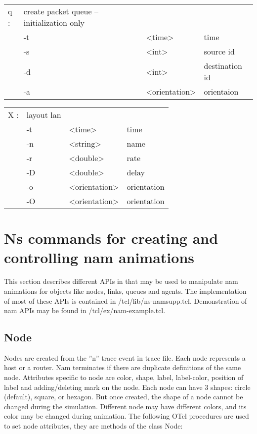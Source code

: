   \begin{tabular}{llll}
  q : & create packet queue -- initialization only & & \\
    &  -t & <time> & time \\
    &  -s & <int> & source id \\
    &  -d & <int> & destination id \\
    &  -a & <orientation> & orientaion \\
  \end{tabular}

  \begin{tabular}{llll}
  X : & layout lan & & \\
    &  -t & <time> & time \\
    &  -n & <string> & name \\
    &  -r & <double> & rate \\
    &  -D & <double> & delay \\
    &  -o & <orientation> & orientation \\
    &  -O & <orientation> & orientation \\
  \end{tabular}



\section{Ns commands for creating and controlling nam animations}
\label{sec:namcommands}

This section describes different APIs in \ns that may be used to
manipulate nam animations for objects like nodes, links, queues and
agents. 
The implementation of most of these APIs is contained in
\ns/tcl/lib/ns-namsupp.tcl.
Demonstration of nam APIs may be found in \ns/tcl/ex/nam-example.tcl.

\subsection{Node}

Nodes are created from the ''n'' trace event in trace file. 
Each node represents a host or a router. 
Nam terminates if there are duplicate definitions of the same node.
Attributes specific to node are color, shape, label, label-color,
position of label and adding/deleting mark on the node.
Each node can have 3 shapes: circle (default), square, or hexagon.
But once created, the shape of a node cannot be changed during the
simulation.
Different node may have different colors, and its color may be changed
during animation. 
The following OTcl procedures are used to set node attributes, they
are methods of the class Node:

